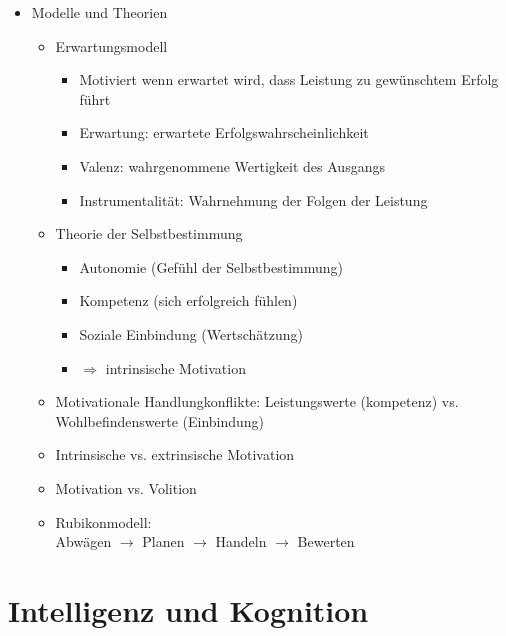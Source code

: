 \documentclass[11pt, paper=a4, twocolumn]{scrartcl}
\begin{document}
\begin{itemize}
		\item Modelle und Theorien
			\begin{itemize}
				\item Erwartungsmodell
					\begin{itemize}
						\item Motiviert wenn erwartet wird, dass 
							Leistung zu gewünschtem Erfolg 
							führt
						\item Erwartung: erwartete 
							Erfolgswahrscheinlichkeit
						\item Valenz: wahrgenommene Wertigkeit des 
							Ausgangs
						\item Instrumentalität: Wahrnehmung der 
							Folgen der Leistung
					\end{itemize}
				\item Theorie der Selbstbestimmung
					\begin{itemize}
						\item Autonomie (Gefühl der 
							Selbstbestimmung)
						\item Kompetenz (sich erfolgreich fühlen)
						\item Soziale Einbindung (Wertschätzung)
						\item $\Rightarrow$ intrinsische Motivation
					\end{itemize}
				\item Motivationale Handlungkonflikte: Leistungswerte 
					(kompetenz) vs. Wohlbefindenswerte (Einbindung)
				\item Intrinsische vs. extrinsische Motivation
				\item Motivation vs. Volition
				\item Rubikonmodell:\\
					Abwägen $\rightarrow$ Planen $\rightarrow$ Handeln 
					$\rightarrow$ Bewerten
			\end{itemize}
	\end{itemize}

	\section{Intelligenz und Kognition}
\end{document}
